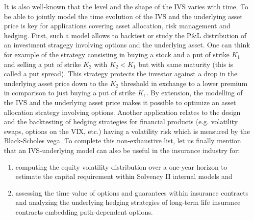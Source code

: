 It is also well-known that the level and the shape of the IVS varies with time. To be able to jointly model the time evolution of the IVS and the underlying asset price is key for applications covering asset allocation, risk management and hedging. First, such a model allows to backtest or study the P\&L distribution of an investment stragegy involving options and the underlying asset. One can think for example of the strategy consisting in buying a stock and a put of strike $K_1$ and selling a put of strike $K_2$ with $K_2<K_1$ but with same maturity (this is called a put spread). This strategy protects the investor against a drop in the underlying asset price down to the $K_2$ threshold in exchange to a lower premium in comparison to just buying a put of strike $K_1$. By extension, the modelling of the IVS and the underlying asset price makes it possible to optimize an asset allocation strategy involving options. Another application relates to the design and the backtesting of hedging strategies for financial products (e.g. volatility swaps, options on the VIX, etc.) having a volatility risk which is measured by the Black-Scholes vega. To complete this non-exhaustive list, let us finally mention that an IVS-underlying model can also be useful in the insurance industry for:
\begin{enumerate}
    \item computing the equity volatility distribution over a one-year horizon to estimate the capital requirement within Solvency II internal models and
    \item  assessing the time value of options and guarantees within insurance contracts and analyzing the underlying hedging strategies of long-term life insurance contracts embedding path-dependent options. 
\end{enumerate}
